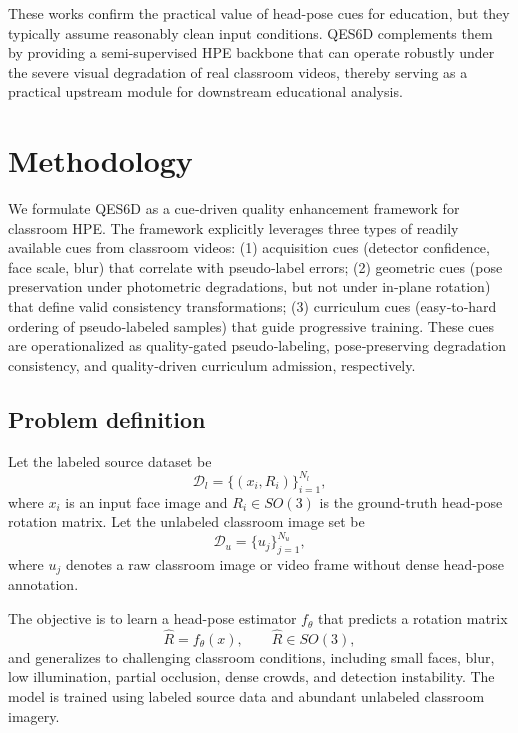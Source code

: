 \documentclass[preprint,12pt]{elsarticle}
\begin{document}
These works confirm the practical value of head-pose cues for education, but they typically assume reasonably clean input conditions. QES6D complements them by providing a semi-supervised HPE backbone that can operate robustly under the severe visual degradation of real classroom videos, thereby serving as a practical upstream module for downstream educational analysis.

\section{Methodology}

We formulate QES6D as a cue‑driven quality enhancement framework for classroom HPE. The framework explicitly leverages three types of readily available cues from classroom videos: (1) acquisition cues (detector confidence, face scale, blur) that correlate with pseudo‑label errors; (2) geometric cues (pose preservation under photometric degradations, but not under in‑plane rotation) that define valid consistency transformations; (3) curriculum cues (easy‑to‑hard ordering of pseudo‑labeled samples) that guide progressive training. These cues are operationalized as quality‑gated pseudo‑labeling, pose‑preserving degradation consistency, and quality‑driven curriculum admission, respectively.

\subsection{Problem definition}

Let the labeled source dataset be
\begin{equation}
\mathcal{D}_l = \{(x_i, R_i)\}_{i=1}^{N_l},
\label{eq:labeled}
\end{equation}
where $x_i$ is an input face image and $R_i \in SO(3)$ is the ground-truth head-pose rotation matrix. Let the unlabeled classroom image set be
\begin{equation}
\mathcal{D}_u = \{u_j\}_{j=1}^{N_u},
\label{eq:unlabeled}
\end{equation}
where $u_j$ denotes a raw classroom image or video frame without dense head-pose annotation.

The objective is to learn a head-pose estimator $f_\theta$ that predicts a rotation matrix
\begin{equation}
\hat{R}=f_\theta(x), \qquad \hat{R}\in SO(3),
\end{equation}
and generalizes to challenging classroom conditions, including small faces, blur, low illumination, partial occlusion, dense crowds, and detection instability. The model is trained using labeled source data and abundant unlabeled classroom imagery.
\end{document}
